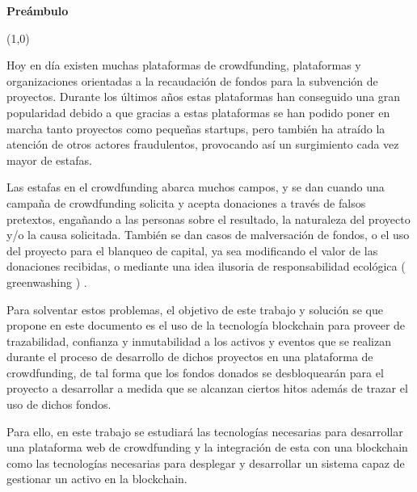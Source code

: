 \thispagestyle{empty}
{\Huge{ \textbf{ Preámbulo }}}

\begin{center}
\line(1,0){\textwidth}
\end{center}

Hoy en día existen muchas plataformas de crowdfunding, plataformas y organizaciones orientadas a la recaudación de fondos para la subvención de proyectos. Durante los últimos años estas plataformas han conseguido una gran popularidad debido a que gracias a estas plataformas se han podido poner en marcha tanto proyectos como pequeñas startups, pero también ha atraído la atención de otros actores fraudulentos, provocando así un surgimiento cada vez mayor de estafas.

\bigskip

Las estafas en el crowdfunding abarca muchos campos, y se dan cuando una campaña de crowdfunding solicita y acepta donaciones a través de falsos pretextos, engañando a las personas sobre el resultado, la naturaleza del proyecto y/o la causa solicitada. También se dan casos de malversación de fondos, o el uso del proyecto para el blanqueo de capital, ya sea modificando el valor de las donaciones recibidas, o mediante una idea ilusoria de responsabilidad ecológica ( greenwashing ) \cite{1}.

\bigskip

Para solventar estos problemas, el objetivo de este trabajo y solución se que propone en este documento es el uso de la tecnología blockchain para proveer de trazabilidad, confianza y inmutabilidad a los activos y eventos que se realizan durante el proceso de desarrollo de dichos proyectos en una plataforma de crowdfunding, de tal forma que los fondos donados se desbloquearán para el proyecto a desarrollar a medida que se alcanzan ciertos hitos además de trazar el uso de dichos fondos.

\bigskip

Para ello, en este trabajo se estudiará las tecnologías necesarias para desarrollar una plataforma web de crowdfunding y la integración de esta con una blockchain como las tecnologías necesarias para desplegar y desarrollar un sistema capaz de gestionar un activo en la blockchain.